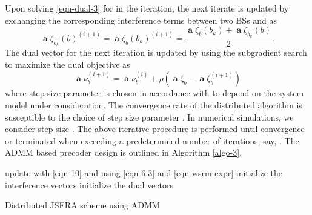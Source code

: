 Upon solving \eqref{eqn-dual-3} for  in the  iteration, the next iterate is updated by exchanging the corresponding interference terms between two \acp{BS}  and  as
\begin{equation}
\mbfa{\zeta}_{b_k}(b)^{(i+1)} = \mbfa{\zeta}_{b}(b_k)^{(i+1)} = \frac{\mbfa{\zeta}_{b}(b_k) + \mbfa{\zeta}_{b_k}(b)}{2}.
\label{if-sg-update}
\end{equation}
The dual vector for the next iteration is updated by using the subgradient search to maximize the dual objective as
\begin{equation}
\mbfa{\nu}_b^{(i+1)} = \mbfa{\nu}_b^{(i)} + \rho \left (\mbfa{\zeta}_b - \mbfa{\zeta}_b^{(i+1)} \right )
\label{dual-sg-update}
\end{equation}
where step size parameter \me{\rho} is chosen in accordance with \cite{boyd2011distributed} to depend on the system model under consideration. The convergence rate of the distributed algorithm is susceptible to the choice of step size parameter \me{\rho}. In numerical simulations, we consider step size . The above iterative procedure is performed until convergence or terminated when exceeding a predetermined number of iterations, say, . The \ac{ADMM} based precoder design is outlined in Algorithm \ref{algo-3}.
\begin{algorithm}
	\SetAlgoLined
	\DontPrintSemicolon
	\BlankLine
	update  with \eqref{eqn-10} and  using \eqref{eqn-6.3} and \eqref{eqn-wsrm-expr} \;
	initialize the interference vectors  \;
	initialize the dual vectors  \;
	\caption{Distributed \ac{JSFRA} scheme using \ac{ADMM}}
	\label{algo-3}
\end{algorithm}

